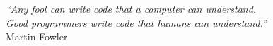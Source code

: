 \begin{epigrafe}
  \vspace*{\fill}
	\begin{flushright}
	\textit{``Any fool can write code that a computer can understand.\\
	Good programmers write code that humans can understand.''\\}
	Martin Fowler
	\end{flushright}
\end{epigrafe}
